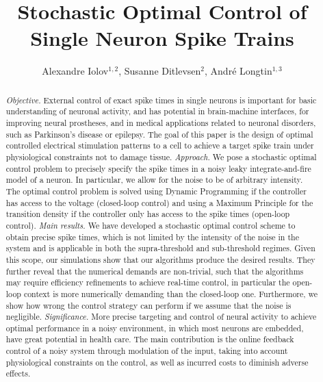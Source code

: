 \documentclass[12pt]{iopart}
\begin{document}
 

\title{Stochastic Optimal Control of Single Neuron Spike Trains}
\author{Alexandre Iolov$^{1,2}$, Susanne Ditlevsen$^2$, Andr\'e Longtin$^{1,3}$ 
		}	
\address{%
     (1) Department of Mathematics and Statistics, University of Ottawa, Ottawa,
    Canada
\\
    (2) Department of Mathematical Sciences, University of Copenhagen,
Copenhagen, Denmark
\\
    (3) Department of Physics, University of Ottawa,
    Ottawa, Canada
}


\begin{abstract}

{\em Objective.} External control of exact spike times in single neurons is
important for basic understanding of neuronal activity, and has potential in
brain-machine interfaces, for improving neural prostheses, and in medical
applications related to neuronal disorders, such as Parkinson's disease or
epilepsy. The goal of this paper is the design of optimal controlled electrical
stimulation patterns to a cell to achieve a target spike train under
physiological constraints not to damage tissue. {\em Approach.} We pose a
stochastic optimal control problem to precisely specify the spike times in a
noisy leaky integrate-and-fire model of a neuron. In particular, we allow for
the noise to be of arbitrary intensity. The optimal control problem is solved
using Dynamic Programming if the controller has access to the voltage
(closed-loop control) and using a Maximum Principle for the transition density
if the controller only has access to the spike times (open-loop control). {\em
Main results.} We have developed a stochastic optimal control scheme to obtain
precise spike times, which is not limited by the intensity of the noise in the
system and is applicable in both the supra-threshold and sub-threshold regimes.
Given this scope, our simulations show that our algorithms produce the desired results. They further reveal that the numerical demands are non-trivial,
such that the algorithms may require efficiency refinements to achieve real-time
control, in particular the open-loop context is more numerically demanding than
the closed-loop one. Furthermore, we show how wrong the control strategy can
perform if we assume that the noise is negligible. {\em Significance.} More
precise targeting and control of neural activity to achieve optimal performance
in a noisy environment, in which most neurons are embedded, have great potential
in health care. The main contribution is the online feedback control of a noisy
system through modulation of the input, taking into account physiological
constraints on the control, as well as incurred costs to diminish adverse
effects.

\end{abstract}
\end{document}
